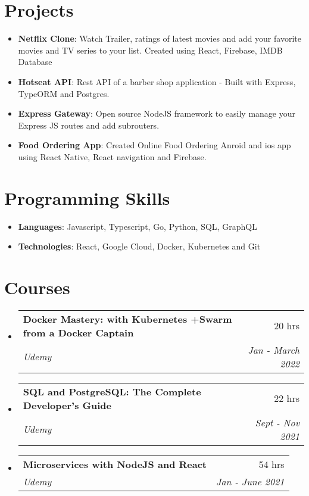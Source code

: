\documentclass[letterpaper,11pt]{article}
\makeatletter
\newcommand{\resumeItem}[2]{
  \item\small{
    \textbf{#1}{: #2 \vspace{-2pt}}
  }
}
\newcommand{\resumeSubheading}[4]{
  \vspace{-1pt}\item
    \begin{tabular*}{0.97\textwidth}{l@{\extracolsep{\fill}}r}
      \textbf{#1} & #2 \\
      \textit{\small#3} & \textit{\small #4} \\
    \end{tabular*}\vspace{-5pt}
}
\newcommand{\resumeSubItem}[2]{\resumeItem{#1}{#2}\vspace{-4pt}}
\newcommand{\resumeSubHeadingListStart}{\begin{itemize}[leftmargin=*]}
\newcommand{\resumeSubHeadingListEnd}{\end{itemize}}
\makeatother
\begin{document}
\section{Projects}
  \resumeSubHeadingListStart
    \resumeSubItem{Netflix Clone}
      {Watch Trailer, ratings of latest movies and add your favorite movies and TV series to your list. Created using React, Firebase, IMDB Database}
    \resumeSubItem{Hotseat API}
      {Rest API of a barber shop application - Built with Express, TypeORM and Postgres.}
    \resumeSubItem{Express Gateway}
      {Open source NodeJS framework to easily manage your Express JS routes and add subrouters.}
    \resumeSubItem{Food Ordering App}
      {Created Online Food Ordering Anroid and ios app using React Native, React navigation and Firebase.}
  \resumeSubHeadingListEnd

%
\section{Programming Skills}
 \resumeSubHeadingListStart
   \item{
     \textbf{Languages}{: Javascript, Typescript, Go, Python, SQL, GraphQL}
    }
    \item{
     \textbf{Technologies}{: React, Google Cloud, Docker, Kubernetes and Git}
    }

 \resumeSubHeadingListEnd
 
\section{Courses}
  \resumeSubHeadingListStart
    \resumeSubheading
      {Docker Mastery: with Kubernetes +Swarm from a Docker Captain
}{20 hrs}
      {Udemy}{Jan - March 2022}
    \resumeSubheading
      {SQL and PostgreSQL: The Complete Developer's Guide
}{22 hrs}
      {Udemy}{Sept - Nov 2021}
    \resumeSubheading
      {Microservices with NodeJS and React}{54 hrs}
      {Udemy}{Jan - June 2021}
  \resumeSubHeadingListEnd
\end{document}
